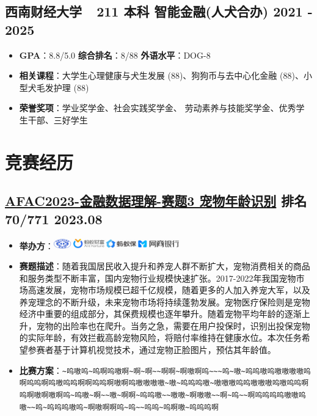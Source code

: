 \documentclass{resume}
\begin{document}
\subsection[西南财经大学]{\textbf{西南财经大学}\ \ \textcolor{mainColor}{\textbf{211}} \quad 本科 \quad 智能金融(人犬合办) \hfill {\small 2021 - 2025}}
\begin{itemize}
    \item \textbf{GPA}：8.8/5.0 \quad \textbf{综合排名}：8/88 \quad \textbf{外语水平}：DOG-8
    \item \textbf{相关课程}：大学生心理健康与犬生发展 (88)、狗狗币与去中心化金融 (88)、小型犬毛发护理 (88)
    \item \textbf{荣誉奖项}：学业奖学金、社会实践奖学金、
劳动素养与技能奖学金、优秀学生干部、三好学生
\end{itemize}
\section[竞赛经历]{ \textbf{\color{mainColor}竞赛经历}}


\subsection[AFAC2023-金融数据理解-赛题3 宠物年龄识别]{\href{https://tianchi.aliyun.com/competition/entrance/532092}{\textbf{AFAC2023-金融数据理解-赛题3 宠物年龄识别}} \quad 排名70/771 \hfill {\small 2023.08}}
\begin{itemize}
    \item \textbf{举办方}：\includegraphics[align=c, height=1.2em]{img/AFAC2023-金融数据理解-赛题3 宠物年龄识别举办方.png}
    \item \textbf{赛题描述}：随着我国居民收入提升和养宠人群不断扩大，宠物消费相关的商品和服务类型不断丰富，国内宠物行业规模快速扩张。2017-2022年我国宠物市场高速发展，宠物市场规模已超千亿规模，随着更多的人加入养宠大军，以及养宠理念的不断升级，未来宠物市场将持续蓬勃发展。宠物医疗保险则是宠物经济中重要的组成部分，其保费规模也逐年攀升。随着宠物平均年龄的逐渐上升，宠物的出险率也在爬升。当务之急，需要在用户投保时，识别出投保宠物的实际年龄，有效拦截高龄宠物风险，将赔付率维持在健康水位。本次任务希望参赛者基于计算机视觉技术，通过宠物正脸图片，预估其年龄值。
    \item \textbf{比赛方案}：\lstinline|~呜嗷呜~呜啊呜嗷啊~啊~啊~~啊啊~啊嗷啊呜~~~呜~嗷~呜呜嗷呜嗷嗷嗷嗷呜啊呜呜啊呜嗷呜呜啊啊呜呜啊嗷啊呜嗷嗷嗷嗷~嗷~呜呜呜嗷~嗷嗷嗷呜呜嗷嗷嗷呜嗷呜呜啊呜啊嗷啊嗷啊呜~呜嗷~啊~~嗷~啊啊~呜呜嗷~~嗷嗷~啊嗷嗷~~啊~呜~~啊呜呜呜呜嗷嗷呜嗷~~呜~呜呜呜嗷呜~啊嗷啊啊呜~呜~~呜呜~呜啊嗷~呜呜呜啊|
\end{itemize}
\end{document}
